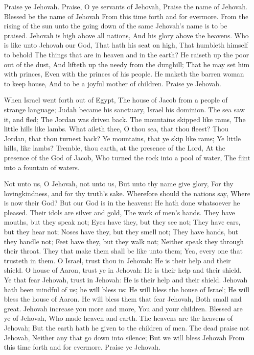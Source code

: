 Praise ye Jehovah. Praise, O ye servants of Jehovah, Praise the name of Jehovah.  Blessed be the name of Jehovah From this time forth and for evermore.  From the rising of the sun unto the going down of the same Jehovah’s name is to be praised.  Jehovah is high above all nations, And his glory above the heavens.  Who is like unto Jehovah our God, That hath his seat on high,  That humbleth himself to behold The things that are in heaven and in the earth?  He raiseth up the poor out of the dust, And lifteth up the needy from the dunghill;  That he may set him with princes, Even with the princes of his people.  He maketh the barren woman to keep house, And to be a joyful mother of children. Praise ye Jehovah. 

When Israel went forth out of Egypt, The house of Jacob from a people of strange language;  Judah became his sanctuary, Israel his dominion.  The sea saw it, and fled; The Jordan was driven back.  The mountains skipped like rams, The little hills like lambs.  What aileth thee, O thou sea, that thou fleest? Thou Jordan, that thou turnest back?  Ye mountains, that ye skip like rams; Ye little hills, like lambs?  Tremble, thou earth, at the presence of the Lord, At the presence of the God of Jacob,  Who turned the rock into a pool of water, The flint into a fountain of waters. 

Not unto us, O Jehovah, not unto us, But unto thy name give glory, For thy lovingkindness, and for thy truth’s sake.  Wherefore should the nations say, Where is now their God?  But our God is in the heavens: He hath done whatsoever he pleased.  Their idols are silver and gold, The work of men’s hands.  They have mouths, but they speak not; Eyes have they, but they see not;  They have ears, but they hear not; Noses have they, but they smell not;  They have hands, but they handle not; Feet have they, but they walk not; Neither speak they through their throat.  They that make them shall be like unto them; Yea, every one that trusteth in them.  O Israel, trust thou in Jehovah: He is their help and their shield.  O house of Aaron, trust ye in Jehovah: He is their help and their shield.  Ye that fear Jehovah, trust in Jehovah: He is their help and their shield.  Jehovah hath been mindful of us; he will bless us: He will bless the house of Israel; He will bless the house of Aaron.  He will bless them that fear Jehovah, Both small and great.  Jehovah increase you more and more, You and your children.  Blessed are ye of Jehovah, Who made heaven and earth.  The heavens are the heavens of Jehovah; But the earth hath he given to the children of men.  The dead praise not Jehovah, Neither any that go down into silence;  But we will bless Jehovah From this time forth and for evermore. Praise ye Jehovah. 

